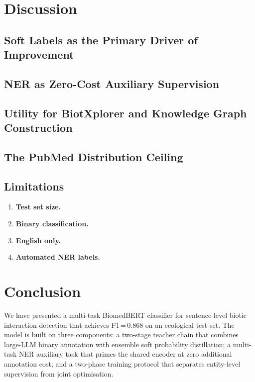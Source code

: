 \documentclass[12pt,a4paper]{article}
\begin{document}
\section{Discussion}
\label{sec:discussion}

\subsection{Soft Labels as the Primary Driver of Improvement}

\subsection{NER as Zero-Cost Auxiliary Supervision}

\subsection{Utility for BiotXplorer and Knowledge Graph Construction}

\subsection{The PubMed Distribution Ceiling}

\subsection{Limitations}

\begin{enumerate}
    \item \textbf{Test set size.}
    \item \textbf{Binary classification.}
    \item \textbf{English only.}
    \item \textbf{Automated NER labels.}
\end{enumerate}

\section{Conclusion}

We have presented a multi-task BiomedBERT classifier for sentence-level
biotic interaction detection that achieves F1\,=\,0.868 on an ecological
test set. The model is built on three components: a two-stage teacher chain
that combines large-LLM binary annotation with ensemble soft probability
distillation; a multi-task NER auxiliary task that primes the shared encoder
at zero additional annotation cost; and a two-phase training protocol that
separates entity-level supervision from joint optimisation.
\end{document}

